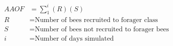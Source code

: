 \documentclass[varwidth=true, border=2pt]{standalone}
\begin{document}
\begin{align*}
AAOF & = \sum_{1}^{i}\left(R\right)\left(S\right)\nonumber \\
R & =  \text{Number of bees recruited to forager class} \nonumber \\
S & =  \text{Number of bees not recruited to forager bees} \nonumber \\
i & =  \text{Number of days simulated} \nonumber \\
\end{align*} 
\end{document}

